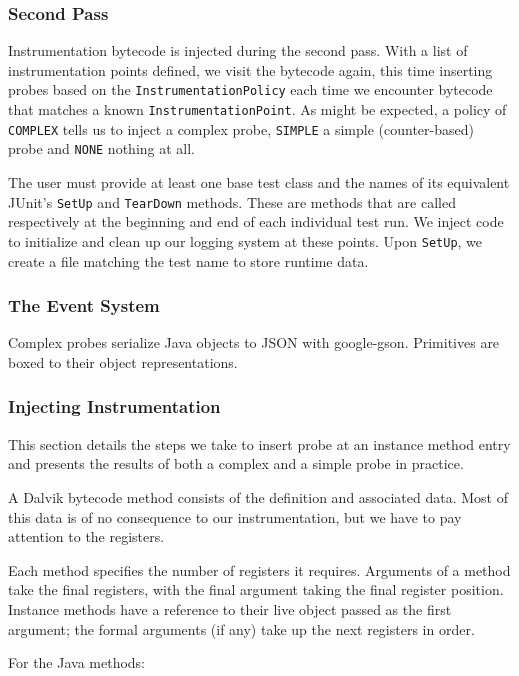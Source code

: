 \subsubsection{Second Pass}

Instrumentation bytecode is injected during the second pass. With a list of
instrumentation points defined, we visit the bytecode again, this time inserting
probes based on the {\tt InstrumentationPolicy} each time we encounter bytecode
that matches a known {\tt InstrumentationPoint}. As might be expected, a policy
of {\tt COMPLEX} tells us to inject a complex probe, {\tt SIMPLE} a simple
(counter-based) probe and {\tt NONE} nothing at all.

The user must provide at least one base test class and the names of its
equivalent JUnit's {\tt SetUp} and {\tt TearDown} methods. These are methods
that are called respectively at the beginning and end of each individual test
run. We inject code to initialize and clean up our logging system at these
points. Upon {\tt SetUp}, we create a file matching the test name to store
runtime data.

\subsubsection{The Event System}

Complex probes serialize Java objects to JSON with google-gson. Primitives are
boxed to their object representations.

\subsubsection{Injecting Instrumentation}

This section details the steps we take to insert probe at an instance method
entry and presents the results of both a complex and a simple probe in practice.

A Dalvik bytecode method consists of the definition and associated data. Most of
this data is of no consequence to our instrumentation, but we have to pay
attention to the registers.

Each method specifies the number of registers it requires. Arguments of a method
take the final registers, with the final argument taking the final register
position. Instance methods have a reference to their live object passed as the
first argument; the formal arguments (if any) take up the next registers in
order.

For the Java methods:

